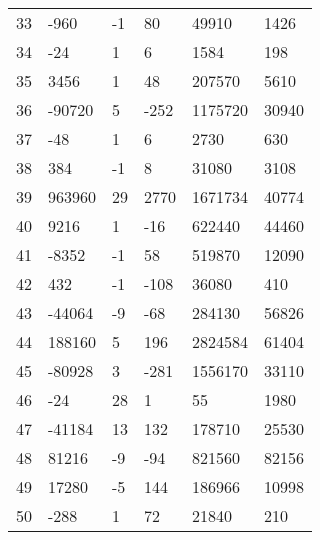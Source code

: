 \documentclass{amsart}
\begin{document}
\begin{longtable}{llllll}
33 & -960 & -1 & 80 & 49910 & 1426\\
34 & -24 & 1 & 6 & 1584 & 198\\
35 & 3456 & 1 & 48 & 207570 & 5610\\
36 & -90720 & 5 & -252 & 1175720 & 30940\\
37 & -48 & 1 & 6 & 2730 & 630\\
38 & 384 & -1 & 8 & 31080 & 3108\\
39 & 963960 & 29 & 2770 & 1671734 & 40774\\
40 & 9216 & 1 & -16 & 622440 & 44460\\
41 & -8352 & -1 & 58 & 519870 & 12090\\
42 & 432 & -1 & -108 & 36080 & 410\\
43 & -44064 & -9 & -68 & 284130 & 56826\\
44 & 188160 & 5 & 196 & 2824584 & 61404\\
45 & -80928 & 3 & -281 & 1556170 & 33110\\
46 & -24 & 28 & 1 & 55 & 1980\\
47 & -41184 & 13 & 132 & 178710 & 25530\\
48 & 81216 & -9 & -94 & 821560 & 82156\\
49 & 17280 & -5 & 144 & 186966 & 10998\\
50 & -288 & 1 & 72 & 21840 & 210\\
\hline
\end{longtable}
\end{document}
